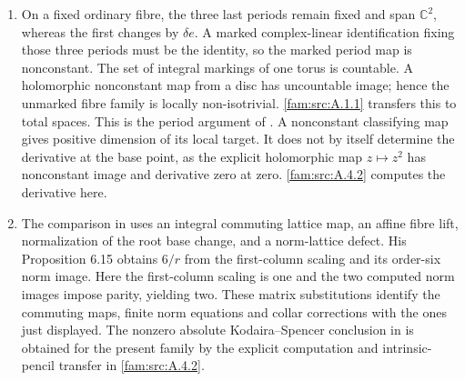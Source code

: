 \begin{remark}\hypertarget{tag-01Q5}{}\label{fam:src:A.4.3}\label{fam:st:A.4.3}

\begin{enumerate}[label=\arabic*.,leftmargin=*]
\item On a fixed ordinary fibre, the three last periods remain fixed and span $\mathbb C^2$, whereas the first changes by $\delta e$. A marked complex-linear identification fixing those three periods must be the identity, so the marked period map is nonconstant. The set of integral markings of one torus is countable. A holomorphic nonconstant map from a disc has uncountable image; hence the unmarked fibre family is locally non-isotrivial. \ref{fam:src:A.1.1} transfers this to total spaces. This is the period argument of \cite[Proposition~4.7, pp.~14--15]{ViaclovskyLog2026}. A nonconstant classifying map gives positive dimension of its local target. It does not by itself determine the derivative at the base point, as the explicit holomorphic map $z\mapsto z^2$ has nonconstant image and derivative zero at zero. \ref{fam:src:A.4.2} computes the derivative here.

\item The comparison in \cite[Lemmas~6.6--6.7 and~6.9, pp.~31--32; Remark~6.8, p.~32; Proposition~6.15, pp.~37--38]{Yang2026} uses an integral commuting lattice map, an affine fibre lift, normalization of the root base change, and a norm-lattice defect. His Proposition 6.15 obtains $6/r$ from the first-column scaling and its order-six norm image. Here the first-column scaling is one and the two computed norm images impose parity, yielding two. These matrix substitutions identify the commuting maps, finite norm equations and collar corrections with the ones just displayed. The nonzero absolute Kodaira--Spencer conclusion in \cite[Theorem~6.18, p.~39]{Yang2026} is obtained for the present family by the explicit computation and intrinsic-pencil transfer in \cref{fam:src:A.4.2}.
\end{enumerate}
\end{remark}